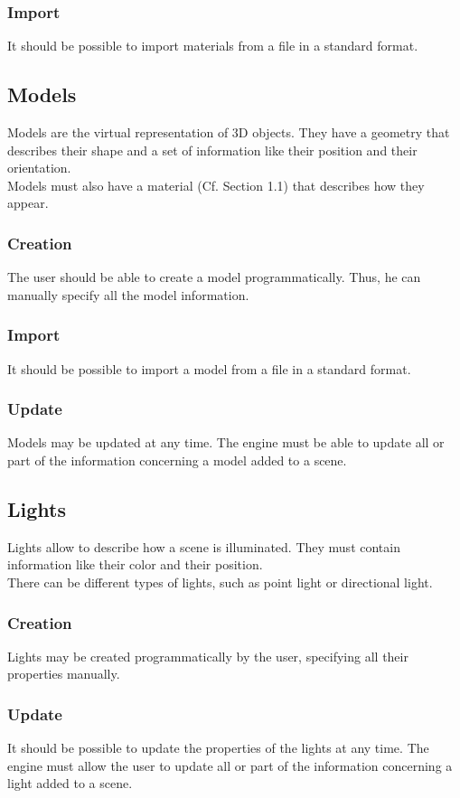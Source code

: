 \documentclass [a4 paper,11pt]{article}
\begin{document}
\subsubsection{Import}
It should be possible to import materials from a file in a standard format.

\subsection{Models}
Models are the virtual representation of 3D objects. They have a geometry that describes their shape and a set of information like their position and their orientation.\\
Models must also have a material (Cf. Section 1.1) that describes how they appear.
\subsubsection{Creation}
The user should be able to create a model programmatically. Thus, he can manually specify all the model information.
\subsubsection{Import}
It should be possible to import a model from a file in a standard format.
\subsubsection{Update}
Models may be updated at any time. The engine must be able to update all or part of the information concerning a model added to a scene.

\subsection{Lights}
Lights allow to describe how a scene is illuminated. They must contain information like their color and their position.\\
There can be different types of lights, such as point light or directional light.
\subsubsection{Creation}
Lights may be created programmatically by the user, specifying all their properties manually.
\subsubsection{Update}
It should be possible to update the properties of the lights at any time. The engine must allow the user to update all or part of the information concerning a light added to a scene.
\end{document}
